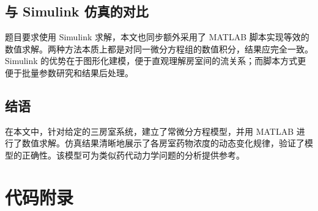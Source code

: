 \subsection{与 Simulink 仿真的对比}
题目要求使用 Simulink 求解，本文也同步额外采用了 MATLAB 脚本实现等效的数值求解。两种方法本质上都是对同一微分方程组的数值积分，结果应完全一致。Simulink 的优势在于图形化建模，便于直观理解房室间的流关系；而脚本方式更便于批量参数研究和结果后处理。

\subsection{结语}
在本文中，针对给定的三房室系统，建立了常微分方程模型，并用 MATLAB 进行了数值求解。仿真结果清晰地展示了各房室药物浓度的动态变化规律，验证了模型的正确性。该模型可为类似药代动力学问题的分析提供参考。

\section{代码附录}
